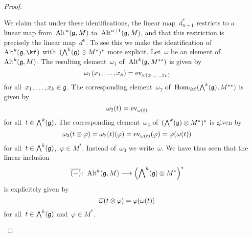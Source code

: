 \begin{proof}
\begin{enumerate}
			We claim that under these identifications, the linear map~$d_{n+1}^*$ restricts to a linear map from~$\operatorname{Alt}^n(\mathfrak{g}, M)$ to~$\operatorname{Alt}^{n+1}(\mathfrak{g}, M)$, and that this restriction is precisely the linear map~$d^n$.
			To see this we make the identification of~$\Alt^k(\glie, \kf)$ with~$( \operatorname{\bigwedge}^k(\mathfrak{g}) \otimes M^* )^*$ more explicit.
			Let~$\omega$ be an element of~$\operatorname{Alt}^k(\mathfrak{g}, M)$.
			The resulting element~$\omega_1$ of~$\operatorname{Alt}^k(\mathfrak{g}, M^{**})$ is given by
			\[
				\omega_1(x_1, \dotsc, x_k)
				=
				\operatorname{ev}_{\omega(x_1, \dotsc, x_k)}
			\]
			for all~$x_1, \dotsc, x_k \in \mathfrak{g}$.
			The corresponding element~$\omega_2$ of~$\Hom_{\kf}( \Exterior^k(\glie), M^{**} )$ is given by
			\[
				\omega_2(t)
				=
				\operatorname{ev}_{\omega(t)}
			\]
			for all~$t \in \operatorname{\bigwedge}^k(\mathfrak{g})$.
			The corresponding element~$\omega_3$ of~$( \operatorname{\bigwedge}^k(\mathfrak{g}) \otimes M^* )^*$ is given by
			\[
				\omega_3(t \otimes \varphi)
				=
				\omega_2(t)(\varphi)
				=
				\operatorname{ev}_{\omega(t)}(\varphi)
				=
				\varphi(\omega(t))
			\]
			for all~$t \in \operatorname{\bigwedge}^k(\mathfrak{g})$,~$\varphi \in M^*$.
			Instead of~$\omega_3$ we write~$\overline{\omega}$.
			We have thus seen that the linear inclusion
			\[
				\overline{ (\ph) }
				\colon
				\Alt^k(\glie, M)
				\to
				\Bigl( \Exterior^k(\glie) \tensor M^* \Bigr)^*
			\]
			is explicitely given by
			\[
				\overline{\omega}(t \otimes \varphi)
				=
				\varphi(\omega(t))
			\]
			for all~$t \in \operatorname{\bigwedge}^k(\mathfrak{g})$ and~$\varphi \in M^*$.


\end{enumerate}
\end{proof}

